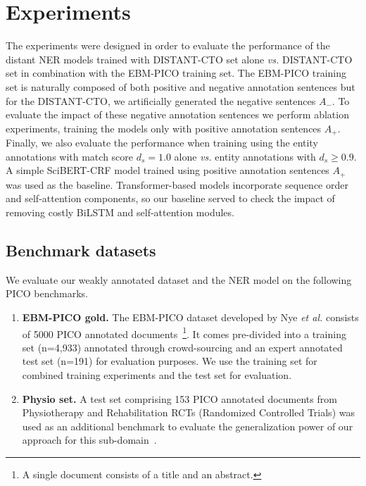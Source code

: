 \documentclass[11pt]{article}
\begin{document}
\section{Experiments}
\label{sec:experiments}
%
The experiments were designed in order to evaluate the performance of the distant NER models trained with DISTANT-CTO set alone \textit{vs.} DISTANT-CTO set in combination with the EBM-PICO training set.
The EBM-PICO training set is naturally composed of both positive and negative annotation sentences but for the DISTANT-CTO, we artificially generated the negative sentences $A_{-}$.
To evaluate the impact of these negative annotation sentences we perform ablation experiments, training the models only with positive annotation sentences $A_{+}$.
Finally, we also evaluate the performance when training using the entity annotations with match score $d_s = 1.0$ alone \textit{vs.} entity annotations with $d_s \geq 0.9$.
A simple SciBERT-CRF model trained using positive annotation sentences $A_{+}$ was used as the baseline. 
Transformer-based models incorporate sequence order and self-attention components, so our baseline served to check the impact of removing costly BiLSTM and self-attention modules.
%
%
\subsection{Benchmark datasets}
\label{subsec:benchmark}
%
We evaluate our weakly annotated dataset and the NER model on the following PICO benchmarks.
%
\begin{enumerate}
    \item \textbf{EBM-PICO gold.} The EBM-PICO dataset developed by Nye \textit{et al.} consists of 5000 PICO annotated documents~\footnote{A single document consists of a title and an abstract.}. It comes pre-divided into a training set (n=4,933) annotated through crowd-sourcing and an expert annotated test set (n=191) for evaluation purposes. We use the training set for combined training experiments and the test set for evaluation.
    \item \textbf{Physio set.} A test set comprising 153 PICO annotated documents from Physiotherapy and Rehabilitation RCTs (Randomized Controlled Trials) was used as an additional benchmark to evaluate the generalization power of our approach for this sub-domain~\cite{dhrangadhariya2021multipico}.
\end{enumerate}
%
%
%
\end{document}
